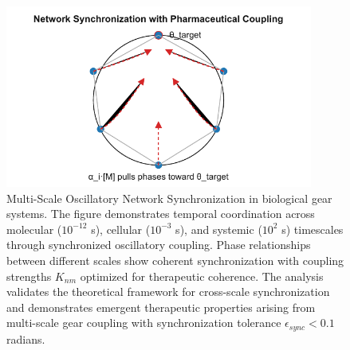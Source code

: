 \begin{figure}[htbp]
\centering
\includegraphics[width=0.9\textwidth]{images/network-synchronization.pdf}
\caption{Multi-Scale Oscillatory Network Synchronization in biological gear systems. The figure demonstrates temporal coordination across molecular ($10^{-12}$ s), cellular ($10^{-3}$ s), and systemic ($10^{2}$ s) timescales through synchronized oscillatory coupling. Phase relationships between different scales show coherent synchronization with coupling strengths $K_{nm}$ optimized for therapeutic coherence. The analysis validates the theoretical framework for cross-scale synchronization and demonstrates emergent therapeutic properties arising from multi-scale gear coupling with synchronization tolerance $\epsilon_{sync} < 0.1$ radians.}
\label{fig:network_synchronization}
\end{figure}


